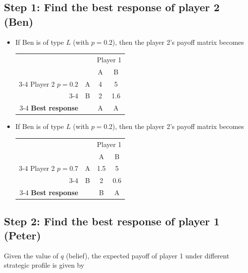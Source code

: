 \documentclass[twoside]{article}
\theoremstyle{definitionstyle}
\begin{document}
\subsection*{Step 1: Find the best response of player 2 (Ben)}
\begin{itemize}
    \item If Ben is of type $L$ (with $p = 0.2$), then the player 2's payoff matrix becomes
    \begin{center}
        \begin{tabular}{rccc}
            & & \multicolumn{2}{c}{Player 1} \\
            & & A & B \\ \cline{3-4}
            Player 2 $p = 0.2$ & A & \multicolumn{1}{|c|}{4} & \multicolumn{1}{c|}{5} \\ \cline{3-4}
            & B & \multicolumn{1}{|c|}{2} & \multicolumn{1}{c|}{1.6} \\ \cline{3-4}
            \textbf{Best response} & & A & A
        \end{tabular}
    \end{center}
    
    \item If Ben is of type $L$ (with $p = 0.2$), then the player 2's payoff matrix becomes
    \begin{center}
        \begin{tabular}{rccc}
            & & \multicolumn{2}{c}{Player 1} \\
            & & A & B \\ \cline{3-4}
            Player 2 $p = 0.7$ & A & \multicolumn{1}{|c|}{1.5} & \multicolumn{1}{c|}{5} \\ \cline{3-4}
            & B & \multicolumn{1}{|c|}{2} & \multicolumn{1}{c|}{0.6} \\ \cline{3-4}
            \textbf{Best response} & & B & A
        \end{tabular}
    \end{center}
\end{itemize}

\subsection*{Step 2: Find the best response of player 1 (Peter)}
Given the value of $q$ (belief), the expected payoff of player 1 under different strategic profile is given by
\end{document}
